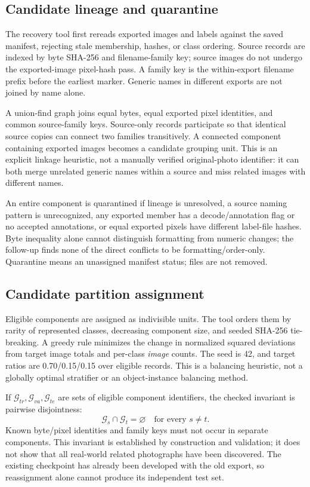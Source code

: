 \documentclass[12pt,journal,draftclsnofoot,onecolumn]{IEEEtran}
\newcommand{\code}[1]{\texttt{\detokenize{#1}}}
\begin{document}
\subsection{Candidate lineage and quarantine}
The recovery tool first rereads exported images and labels against the saved manifest, rejecting stale membership, hashes, or class ordering. Source records are indexed by byte SHA-256 and filename-family key; source images do not undergo the exported-image pixel-hash pass. A family key is the within-export filename prefix before the earliest \code{.rf.<32 hex digits>} marker. Generic names in different exports are not joined by name alone.

A union-find graph joins equal bytes, equal exported pixel identities, and common source-family keys. Source-only records participate so that identical source copies can connect two families transitively. A connected component containing exported images becomes a candidate grouping unit. This is an explicit linkage heuristic, not a manually verified original-photo identifier: it can both merge unrelated generic names within a source and miss related images with different names.

An entire component is quarantined if lineage is unresolved, a source naming pattern is unrecognized, any exported member has a decode/annotation flag or no accepted annotations, or equal exported pixels have different label-file hashes. Byte inequality alone cannot distinguish formatting from numeric changes; the follow-up finds none of the direct conflicts to be formatting/order-only. Quarantine means an unassigned manifest status; files are not removed.

\subsection{Candidate partition assignment}
Eligible components are assigned as indivisible units. The tool orders them by rarity of represented classes, decreasing component size, and seeded SHA-256 tie-breaking. A greedy rule minimizes the change in normalized squared deviations from target image totals and per-class \emph{image} counts. The seed is 42, and target ratios are 0.70/0.15/0.15 over eligible records. This is a balancing heuristic, not a globally optimal stratifier or an object-instance balancing method.

If $\mathcal{G}_{tr},\mathcal{G}_{va},\mathcal{G}_{te}$ are sets of eligible component identifiers, the checked invariant is pairwise disjointness:
\begin{equation}
\mathcal{G}_s\cap\mathcal{G}_t=\varnothing\quad\text{for every }s\ne t.
\end{equation}
Known byte/pixel identities and family keys must not occur in separate components. This invariant is established by construction and validation; it does not show that all real-world related photographs have been discovered. The existing checkpoint has already been developed with the old export, so reassignment alone cannot produce its independent test set.
\end{document}

